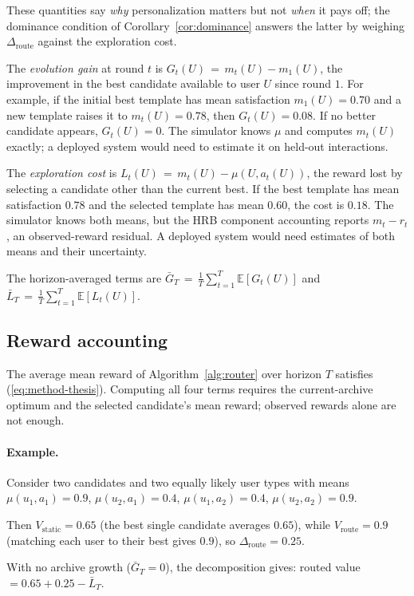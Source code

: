 \documentclass{article} %
\providecommand{\E}{\mathbb{E}}
\renewcommand{\eqref}[1]{\textup{(\ref{#1})}}
\begin{document}
These quantities say \emph{why} personalization matters but not \emph{when} it pays off; the dominance condition of Corollary~\ref{cor:dominance} answers the latter by weighing $\Delta_{\mathrm{route}}$ against the exploration cost.

The \emph{evolution gain} at round $t$ is $G_t(U) \,=\, m_t(U) - m_1(U)$, the improvement in the best candidate available to user $U$ since round $1$. For example, if the initial best template has mean satisfaction $m_1(U) = 0.70$ and a new template raises it to $m_t(U) = 0.78$, then $G_t(U) = 0.08$. If no better candidate appears, $G_t(U) = 0$. The simulator knows $\mu$ and computes $m_t(U)$ exactly; a deployed system would need to estimate it on held-out interactions.

The \emph{exploration cost} is $L_t(U) \,=\, m_t(U) - \mu(U, a_t(U))$, the reward lost by selecting a candidate other than the current best. If the best template has mean satisfaction $0.78$ and the selected template has mean $0.60$, the cost is $0.18$. The simulator knows both means, but the HRB component accounting reports \(m_t-r_t\), an observed-reward residual. A deployed system would need estimates of both means and their uncertainty.


The horizon-averaged terms are $\bar G_T \,=\, \frac{1}{T}\sum_{t=1}^T \E[G_t(U)]$ and $\bar L_T \,=\, \frac{1}{T}\sum_{t=1}^T \E[L_t(U)]$.

\subsection{Reward accounting}
The average mean reward of Algorithm~\ref{alg:router} over horizon $T$
satisfies \eqref{eq:method-thesis}. Computing all four terms requires the current-archive optimum and the
selected candidate's mean reward; observed rewards alone are not enough.

\paragraph{Example.} Consider two candidates and two equally likely user types with means $\mu(u_1,a_1)=0.9$, $\mu(u_2,a_1)=0.4$, $\mu(u_1,a_2)=0.4$, $\mu(u_2,a_2)=0.9$.

Then $V_{\mathrm{static}}=0.65$ (the best single candidate averages $0.65$), while $V_{\mathrm{route}}=0.9$ (matching each user to their best gives $0.9$), so $\Delta_{\mathrm{route}}=0.25$.

With no archive growth ($\bar G_T=0$), the decomposition gives: routed value $= 0.65 + 0.25 - \bar L_T$.
\end{document}
